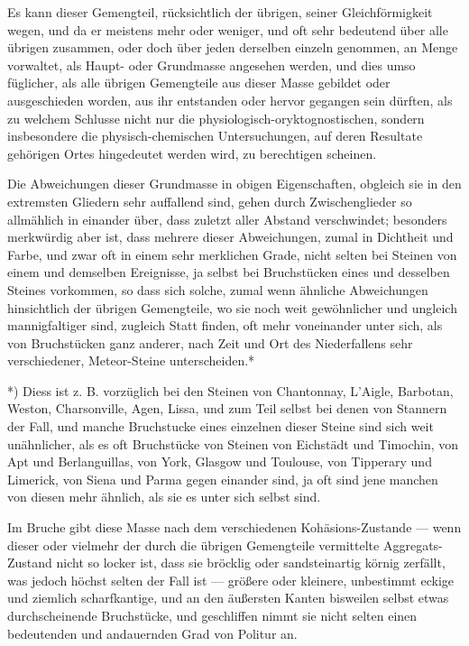 \documentclass[a4paper, 11pt, oneside, german]{article}
\begin{document}
Es kann dieser Gemengteil, rücksichtlich der übrigen, seiner Gleichförmigkeit wegen, und da er meistens mehr oder weniger, und oft sehr bedeutend über alle übrigen zusammen, oder doch über jeden derselben einzeln genommen, an Menge vorwaltet, als Haupt- oder Grundmasse angesehen werden, und dies umso füglicher, als alle übrigen Gemengteile aus dieser Masse gebildet oder ausgeschieden worden, aus ihr entstanden oder hervor gegangen sein dürften, als zu welchem Schlusse nicht nur die physiologisch-oryktognostischen, sondern insbesondere die physisch-chemischen Untersuchungen, auf deren Resultate gehörigen Ortes hingedeutet werden wird, zu berechtigen scheinen.

Die Abweichungen dieser Grundmasse in obigen Eigenschaften, obgleich sie in den extremsten Gliedern sehr auffallend sind, gehen durch Zwischenglieder so allmählich in einander über, dass zuletzt aller Abstand verschwindet; besonders merkwürdig aber ist, dass mehrere dieser Abweichungen, zumal in Dichtheit und Farbe, und zwar oft in einem sehr merklichen Grade, nicht selten bei Steinen von einem und demselben Ereignisse, ja selbst bei Bruchstücken eines und desselben Steines vorkommen, so dass sich solche, zumal wenn ähnliche Abweichungen hinsichtlich der übrigen Gemengteile, wo sie noch weit gewöhnlicher und ungleich mannigfaltiger sind, zugleich Statt finden, oft mehr voneinander unter sich, als von Bruchstücken ganz anderer, nach Zeit und Ort des Niederfallens sehr verschiedener, Meteor-Steine unterscheiden.*

*) Diess ist z. B. vorzüglich bei den Steinen von Chantonnay, L'Aigle, Barbotan, Weston, Charsonville, Agen, Lissa, und zum Teil selbst bei denen von Stannern der Fall, und manche Bruchstucke eines einzelnen dieser Steine sind sich weit unähnlicher, als es oft Bruchstücke von Steinen von Eichstädt und Timochin, von Apt und Berlanguillas, von York, Glasgow und Toulouse, von Tipperary und Limerick, von Siena und Parma gegen einander sind, ja oft sind jene manchen von diesen mehr ähnlich, als sie es unter sich selbst sind.

Im Bruche gibt diese Masse nach dem verschiedenen Kohäsions-Zustande --- wenn dieser oder vielmehr der durch die übrigen Gemengteile vermittelte Aggregats-Zustand nicht so locker ist, dass sie bröcklig oder sandsteinartig körnig zerfällt, was jedoch höchst selten der Fall ist --- größere oder kleinere, unbestimmt eckige und ziemlich scharfkantige, und an den äußersten Kanten bisweilen selbst etwas durchscheinende Bruchstücke, und geschliffen nimmt sie nicht selten einen bedeutenden und andauernden Grad von Politur an.
\end{document}
